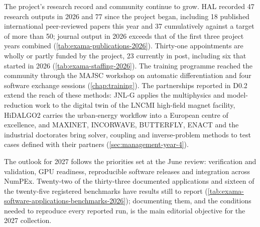 The project's research record and community continue to grow. HAL
recorded 47 research outputs in 2026 and 77 since the project began,
including 18 published international peer-reviewed papers this year
and 37 cumulatively against a target of more than 50; journal output
in 2026 exceeds that of the first three project years combined
(\cref{tab:exama-publications-2026}). Thirty-one appointments are
wholly or partly funded by the project, 23 currently in post,
including six that started in 2026
(\cref{tab:exama-staffing-2026}). The training programme reached the
community through the MAJSC workshop on automatic differentiation
and four software exchange sessions (\cref{chap:training}). The
partnerships reported in D0.2 extend the reach of these methods:
JNL-G applies the multiphysics and model-reduction work to the
digital twin of the LNCMI high-field magnet facility, HiDALGO2
carries the urban-energy workflow into a European centre of
excellence, and MAXINET, INCORWAVE, BUTTERFLY, ENACT and the
industrial doctorates bring solver, coupling and inverse-problem
methods to test cases defined with their partners
(\cref{sec:management-year-4}).

The outlook for 2027 follows the priorities set at the June review:
verification and validation, GPU readiness, reproducible software
releases and integration across NumPEx.
Twenty-two of the thirty-three documented applications and sixteen of
the twenty-five registered benchmarks have results still to report
(\cref{tab:exama-software-applications-benchmarks-2026}); documenting
them, and the conditions needed to reproduce every reported run, is
the main editorial objective for the 2027 collection.
